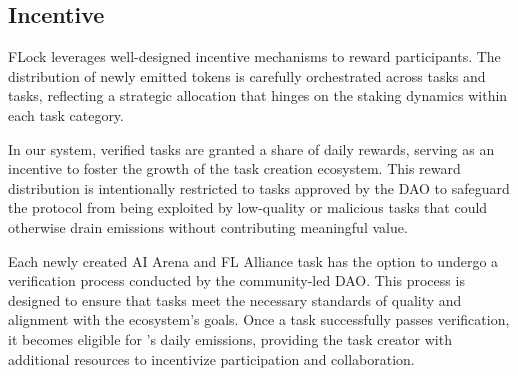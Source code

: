\documentclass[conference]{IEEEtran}
\begin{document}

\subsection{Incentive}


FLock leverages well-designed incentive mechanisms to reward participants. The distribution of newly emitted tokens is carefully orchestrated across \SNT tasks and \FL tasks, reflecting a strategic allocation that hinges on the staking dynamics within each task category. 


In our system, verified tasks are granted a share of daily rewards, serving as an incentive to foster the growth of the task creation ecosystem. This reward distribution is intentionally restricted to tasks approved by the DAO to safeguard the protocol from being exploited by low-quality or malicious tasks that could otherwise drain emissions without contributing meaningful value.

Each newly created AI Arena and FL Alliance task has the option to undergo a verification process conducted by the community-led DAO. This process is designed to ensure that tasks meet the necessary standards of quality and alignment with the ecosystem's goals. Once a task successfully passes verification, it becomes eligible for \FML's daily emissions, providing the task creator with additional resources to incentivize participation and collaboration.
\end{document}
